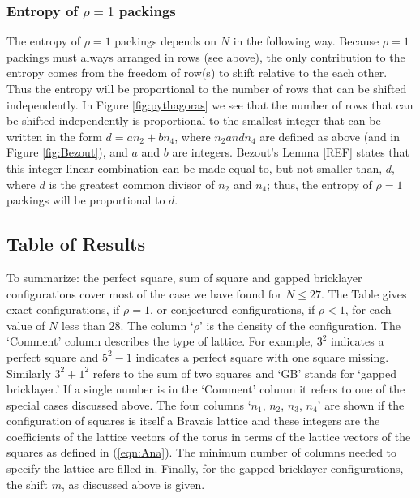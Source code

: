 \subsubsection{Entropy of $\rho=1$ packings}

The entropy of $\rho=1$ packings depends on $N$ in the following way.  Because $\rho=1$ packings must always arranged in rows (see above), the only contribution to the entropy comes from the freedom
of row(s) to shift relative to the each other.  Thus the entropy will be proportional to the number of rows that can be  shifted independently.  In Figure \ref{fig:pythagoras} we see that the number of rows that can be shifted independently is proportional to the smallest integer that can be written in the form $d=a n_2 + b n_4$, where $n_2 and n_4$ are defined as above (and in Figure \ref{fig:Bezout}), and $a$ and $b$ are integers.  Bezout's Lemma [REF] states that this integer linear combination can be made equal to, but not smaller than, $d$, where $d$ is the greatest common divisor of $n_2$ and $n_4$;  thus, the entropy of $\rho=1$ packings will be proportional to $d$.  

\subsection{Table of Results}

To summarize: the perfect square, sum of square and gapped bricklayer configurations cover most of the case we have found for $N \leq 27$.  The Table gives exact configurations, if $\rho=1$, or conjectured configurations, if $\rho<1$, for each value of  $N$ less than 28.  The column `$\rho$' is the density of the configuration. The `Comment' column describes the type of lattice.   For example, $3^2$ indicates a perfect square and $5^2-1$ indicates a perfect square with one square missing.  Similarly $3^2+1^2$ refers to the sum of two squares and `GB' stands for `gapped bricklayer.'  If a single number is in the `Comment' column it refers to one of the special cases discussed above.  The four columns `$n_1$, $n_2$, $n_3$, $n_4$' are shown if the configuration of squares is itself a Bravais lattice and these integers are the coefficients of the lattice vectors of the torus in terms of the lattice vectors of the squares as defined in (\ref{eqn:Ana}).  The minimum number of columns needed to specify the lattice are filled in.  Finally, for the gapped bricklayer configurations, the shift $m$, as discussed above is given.

